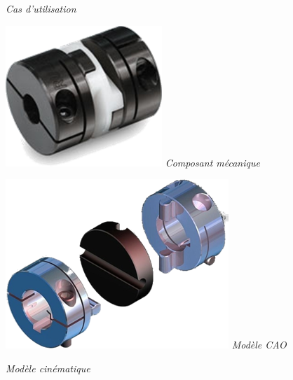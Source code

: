 \documentclass[11pt,oneside]{article}
\begin{document}
\begin{center}
\hfill
\begin{minipage}[c]{.21\linewidth}
\begin{center}
\textit{Cas d'utilisation}
\end{center}
\end{minipage} \hfill
\begin{minipage}[c]{.21\linewidth}
\begin{center}
\includegraphics[width=.9\textwidth]{png/oldham2}
\textit{Composant mécanique}
\end{center}
\end{minipage} \hfill
\begin{minipage}[c]{.21\linewidth}
\begin{center}
\includegraphics[width=.9\textwidth]{png/oldham3}
\textit{Modèle CAO \cite{oldham3}}
\end{center} 
\end{minipage}\hfill
\begin{minipage}[c]{.21\linewidth}
\begin{center}
\textit{Modèle cinématique}
\end{center} 
\end{minipage}\hfill
\end{center}
\end{document}
